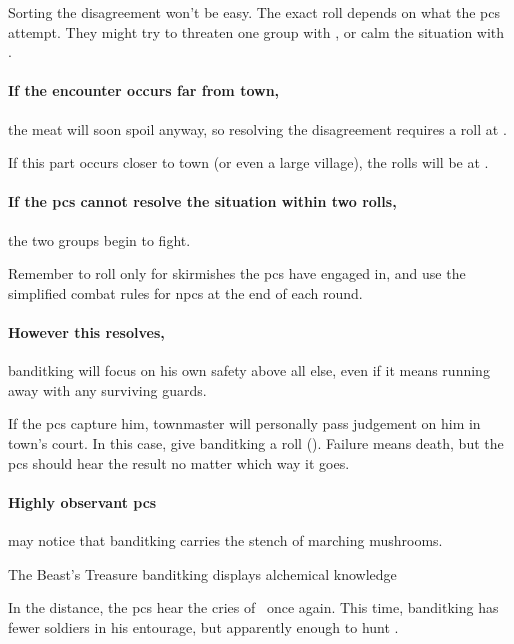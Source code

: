 Sorting the disagreement won't be easy.
The exact roll depends on what the \glspl{pc} attempt.
They might try to threaten one group with , or calm the situation with .

\paragraph{If the encounter occurs far from \gls{town},}
the meat will soon spoil anyway, so resolving the disagreement requires a roll at \tn[9].

If this part occurs closer to \gls{town} (or even a large \gls{village}), the rolls will be at \tn[12].

\paragraph{If the \glspl{pc} cannot resolve the situation within two rolls,}
the two groups begin to fight.

Remember to roll only for skirmishes the \glspl{pc} have engaged in, and use the simplified combat rules for \glspl{npc} at the end of each round.%

\banditking

\paragraph{However this resolves,}
\gls{banditking} will focus on his own safety above all else, even if it means running away with any surviving guards.

If the \glspl{pc} capture him, \gls{townmaster} will personally pass judgement on him in \gls{town}'s \gls{court}.
In this case, give \gls{banditking} a  roll (\tn[8]).
Failure means death, but the \glspl{pc} should hear the result no matter which way it goes.

\paragraph{Highly observant \glspl{pc}}
may notice that \gls{banditking} carries the stench of marching mushrooms.%

{The Beast's Treasure}%
{\Gls{banditking} displays alchemical knowledge}%

In the distance, the \glspl{pc} hear the cries of \localMonster\ once again.
This time, \gls{banditking} has fewer soldiers in his entourage, but apparently enough to hunt \localMonster.

